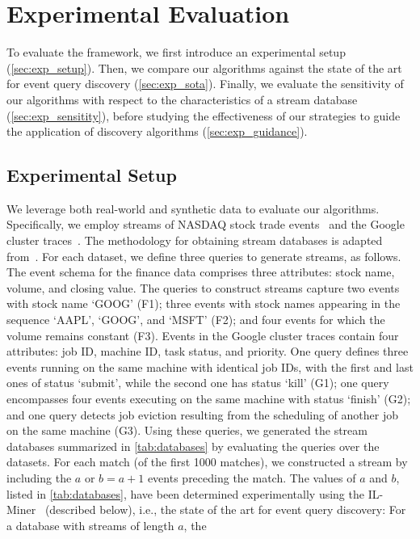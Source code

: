 \section{Experimental Evaluation}
\label{sec:evaluation}
To evaluate the \sys{} framework, we
first introduce an experimental setup (\autoref{sec:exp_setup}). Then, we
compare our algorithms against the state of the art for event query
discovery (\autoref{sec:exp_sota}). Finally, we evaluate the sensitivity of
our algorithms with respect to the characteristics of a stream database
(\autoref{sec:exp_sensitity}), before studying the effectiveness of our
strategies to guide the application of discovery algorithms
(\autoref{sec:exp_guidance}).
\subsection{Experimental Setup}
\label{sec:exp_setup}
We leverage both real-world and synthetic data to
evaluate our algorithms.
Specifically, we employ streams of NASDAQ stock trade events~\cite{eodata}
and the Google cluster traces~\cite{reiss2011google}. The
methodology for obtaining stream databases is
adapted from~\cite{ilminer}.
For each dataset, we define three queries to generate streams, as follows.
The event schema for the finance data comprises three attributes: stock
name, volume, and closing value. The queries to construct streams capture
two events with stock name `GOOG' (F1); three events with stock names
appearing in the sequence `AAPL', `GOOG', and `MSFT' (F2); and four events
for which the volume remains constant (F3).
Events in the Google cluster traces contain four attributes:
job ID, machine ID, task status, and priority. One query
defines three events running on the same machine with identical job IDs,
with the first and last ones of status `submit', while the second one has
status `kill' (G1); one query encompasses four events executing on the same
machine with status `finish' (G2); and one query detects job eviction
resulting from the scheduling of another job on the same machine (G3).
Using these queries, we generated the stream databases summarized in
\autoref{tab:databases} by evaluating the queries over the
datasets. For each match (of the first 1000 matches), we constructed a
stream by including the $a$ or
$b=a+1$ events preceding the match. The values of $a$ and $b$, listed in
\autoref{tab:databases}, have been determined experimentally using the
IL-Miner~\cite{ilminer} (described below), i.e., the state of the art for
event query discovery: For a database with streams of length $a$, the
